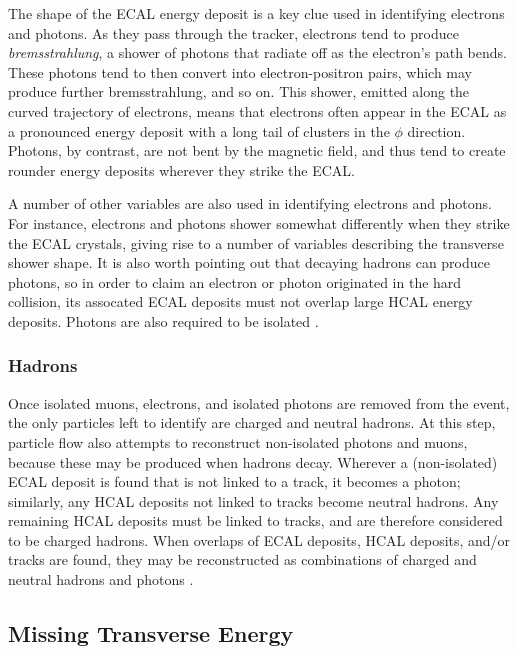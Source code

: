 The shape of the ECAL energy deposit is a key clue used in identifying
electrons and photons. As they pass through the tracker, electrons
tend to produce \emph{bremsstrahlung}, a shower of photons that
radiate off as the electron's path bends. These photons tend to then
convert into electron-positron pairs, which may produce further
bremsstrahlung, and so on. This shower, emitted along the curved
trajectory of electrons, means that electrons often appear in the ECAL
as a pronounced energy deposit with a long tail of clusters in the $\phi$
direction. Photons, by contrast, are not bent by the magnetic field,
and thus tend to create rounder energy deposits wherever they strike
the ECAL.

A number of other variables are also used in identifying electrons and
photons. For instance, electrons and photons shower somewhat
differently when they strike the ECAL crystals, giving rise to a
number of variables describing the transverse shower shape. It is also
worth pointing out that decaying
hadrons can produce photons, so in order to
claim an electron or photon originated in the hard collision, its
assocated ECAL deposits must not overlap large HCAL energy
deposits. Photons are also required to be isolated \cite{particleflow}.

\subsubsection{Hadrons}
\label{sssec:cms:pf:hadrons}

Once isolated muons, electrons, and isolated photons are removed from
the event, the only particles left to identify are charged and neutral
hadrons. At this step, particle flow also attempts to reconstruct
non-isolated photons and muons, because these may be produced when
hadrons decay. Wherever a (non-isolated) ECAL deposit is found that is
not linked to a track, it becomes a photon; similarly, any HCAL
deposits not linked to tracks become neutral hadrons. Any remaining
HCAL deposits must be linked to tracks, and are therefore considered
to be charged hadrons. When overlaps of ECAL deposits, HCAL deposits,
and/or tracks are found, they may be reconstructed as combinations of
charged and neutral hadrons and photons \cite{particleflow}.

\subsection{Missing Transverse Energy}
\label{ssec:cms:reco:met}

